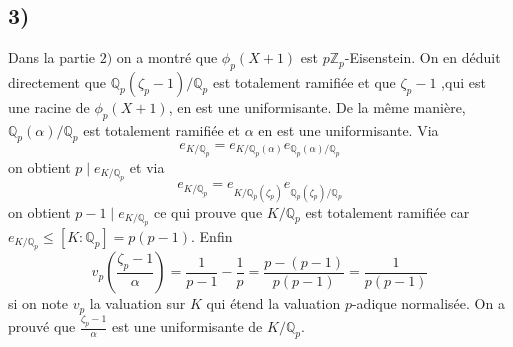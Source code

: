 \documentclass[a4paper,12pt]{article}
\newcommand{\Z}{\mathbb{Z}}
\newcommand{\Q}{\mathbb{Q}}
\theoremstyle{plain}
\theoremstyle{definition}
\theoremstyle{remark}
\begin{document}
\subsection*{3)}
Dans la partie $2)$ on a montré que $\phi_p(X+1)$ est 
$p\Z_p$-Eisenstein. On en déduit directement que 
$\Q_p(\zeta_p-1)/\Q_p$ est totalement ramifiée et que $\zeta_p-1$
,qui est une racine de $\phi_p(X+1)$, en est une uniformisante.
De la même manière, $\Q_p(\alpha)/\Q_p$ est totalement ramifiée
et $\alpha$ en est une uniformisante. Via 
\[e_{K/\Q_p}=e_{K/\Q_p(\alpha)}e_{\Q_p(\alpha)/\Q_p}\]
on obtient $p\mid e_{K/\Q_p}$ et via 
\[e_{K/\Q_p}=e_{K/\Q_p(\zeta_p)}e_{\Q_p(\zeta_p)/\Q_p}\]
on obtient $p-1\mid e_{K/\Q_p}$ ce qui prouve que $K/\Q_p$ est
totalement ramifiée car $e_{K/\Q_p}\leq[K:\Q_p]=p(p-1)$. Enfin 
\[v_p(\frac{\zeta_p-1}{\alpha})=\frac{1}{p-1}-\frac{1}{p}=\frac{p-(p-1)}{p(p-1)}=\frac{1}{p(p-1)}\]
si on note $v_p$ la valuation sur $K$ qui étend la valuation 
$p$-adique normalisée. On a prouvé que $\frac{\zeta_p-1}{\alpha}$
est une uniformisante de $K/\Q_p$. 
\end{document}
